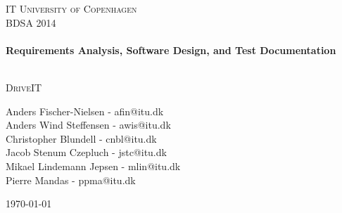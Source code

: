 



%


\begin{center}
\thispagestyle{empty}


\textsc{\LARGE IT University of Copenhagen}\\[1.5cm]

\textsc{\Large BDSA 2014 }\\[0.5cm]

\HRule \\[0.4cm]
{ \huge \bfseries Requirements Analysis, Software Design, and Test Documentation \\ [0.4cm]
    }

\HRule \\[1cm]

\textsc{\Large DriveIT}\\[1.5cm]

\begin{minipage}{1\textwidth}
\begin{center} \large
Anders Fischer-Nielsen - afin@itu.dk\\
Anders Wind Steffensen - awis@itu.dk\\
Christopher Blundell - cnbl@itu.dk\\
Jacob Stenum Czepluch - jstc@itu.dk\\
Mikael Lindemann Jepsen - mlin@itu.dk\\
Pierre Mandas - ppma@itu.dk\\
\end{center}
\end{minipage}


\vfill

{\large \today}

\end{center}

\frontmatter%

%
%


\tableofcontents*
\newpage
\listoffigures
\newpage

\mainmatter%











